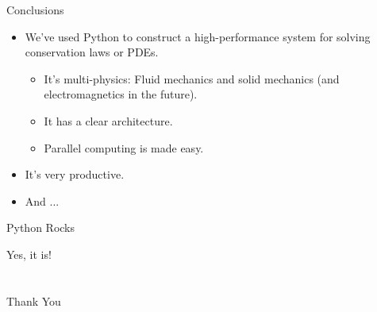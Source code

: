 \documentclass[dvips,xcolor=pst,14pt]{beamer}
\begin{document}
\begin{frame}{
%
Conclusions
%
}
\begin{itemize}
  \item We've used Python to construct a high-performance system for solving
  conservation laws or PDEs.
  \begin{itemize} \normalsize
    \item It's multi-physics: Fluid mechanics and solid mechanics (and
    electromagnetics in the future).
    \item It has a clear architecture.
    \item Parallel computing is made easy.
  \end{itemize}
  \item It's very \alert{productive}.
  \item And ...
\end{itemize}
\end{frame}

\begin{frame}{
%
Python Rocks
%
}
\begin{center} \Huge
  Yes, it is!
\end{center}
\end{frame}

\section*{}

\begin{frame}{}
\begin{center} \Huge
  Thank You
\end{center}
\end{frame}
\end{document}
